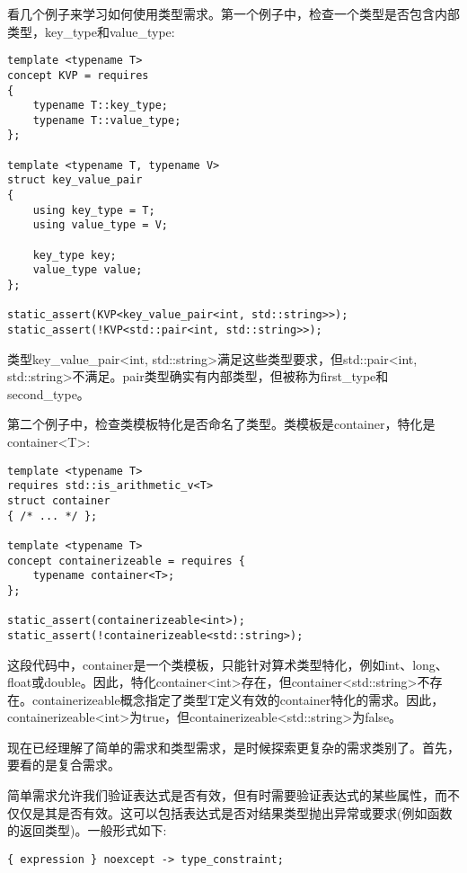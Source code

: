 看几个例子来学习如何使用类型需求。第一个例子中，检查一个类型是否包含内部类型，key\_type和value\_type:

\begin{lstlisting}[style=styleCXX]
template <typename T>
concept KVP = requires
{
	typename T::key_type;
	typename T::value_type;
};

template <typename T, typename V>
struct key_value_pair
{
	using key_type = T;
	using value_type = V;
	
	key_type key;
	value_type value;
};

static_assert(KVP<key_value_pair<int, std::string>>);
static_assert(!KVP<std::pair<int, std::string>>);
\end{lstlisting}

类型key\_value\_pair<int, std::string>满足这些类型要求，但std::pair<int, std::string>不满足。pair类型确实有内部类型，但被称为first\_type和second\_type。

第二个例子中，检查类模板特化是否命名了类型。类模板是container，特化是container<T>:

\begin{lstlisting}[style=styleCXX]
template <typename T>
requires std::is_arithmetic_v<T>
struct container
{ /* ... */ };

template <typename T>
concept containerizeable = requires {
	typename container<T>;
};

static_assert(containerizeable<int>);
static_assert(!containerizeable<std::string>);
\end{lstlisting}

这段代码中，container是一个类模板，只能针对算术类型特化，例如int、long、float或double。因此，特化container<int>存在，但container<std::string>不存在。containerizeable概念指定了类型T定义有效的container特化的需求。因此，containerizeable<int>为true，但containerizeable<std::string>为false。

现在已经理解了简单的需求和类型需求，是时候探索更复杂的需求类别了。首先，要看的是复合需求。


简单需求允许我们验证表达式是否有效，但有时需要验证表达式的某些属性，而不仅仅是其是否有效。这可以包括表达式是否对结果类型抛出异常或要求(例如函数的返回类型)。一般形式如下:

\begin{lstlisting}[style=styleCXX]
{ expression } noexcept -> type_constraint;
\end{lstlisting}

